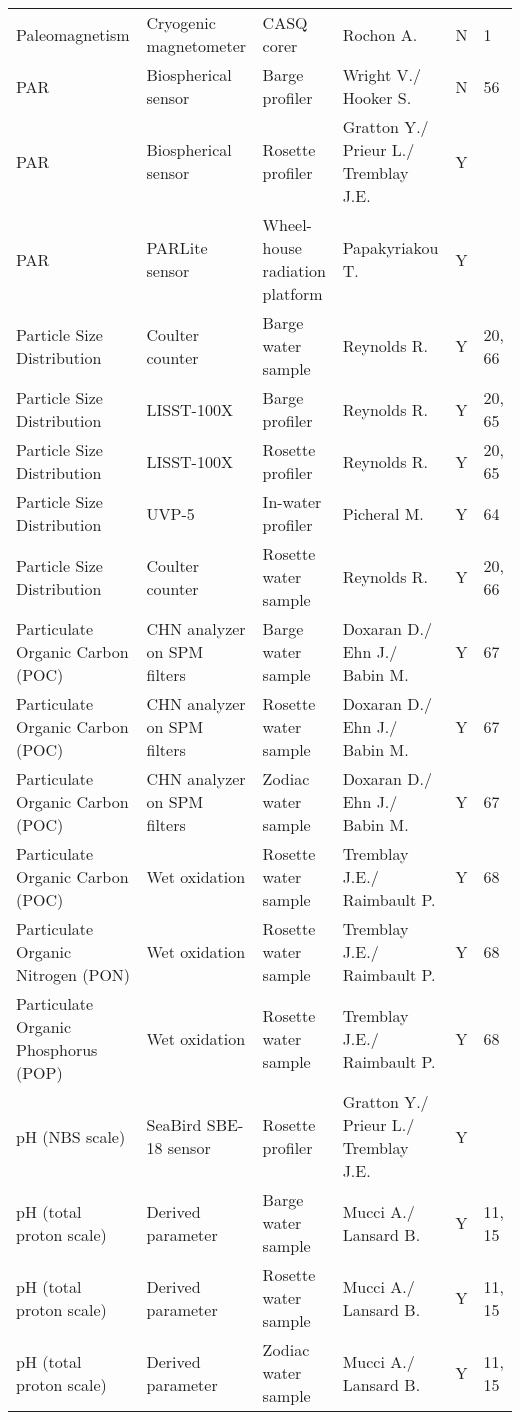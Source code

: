 \begin{ThreePartTable}
\begin{longtable}[t]{llllll}
\addlinespace
Paleomagnetism & Cryogenic magnetometer & CASQ corer & Rochon A. & N & 1\\
PAR & Biospherical sensor & Barge profiler & Wright V./ Hooker S. & N & 56\\
PAR & Biospherical sensor & Rosette profiler & Gratton Y./ Prieur L./ Tremblay J.E. & Y & \\
PAR & PARLite sensor & Wheel-house radiation platform & Papakyriakou T. & Y & \\
Particle Size Distribution & Coulter counter & Barge water sample & Reynolds R. & Y & 20, 66\\
\addlinespace
Particle Size Distribution & LISST-100X & Barge profiler & Reynolds R. & Y & 20, 65\\
Particle Size Distribution & LISST-100X & Rosette profiler & Reynolds R. & Y & 20, 65\\
Particle Size Distribution & UVP-5 & In-water profiler & Picheral M. & Y & 64\\
Particle Size Distribution & Coulter counter & Rosette water sample & Reynolds R. & Y & 20, 66\\
Particulate Organic Carbon (POC) & CHN analyzer on SPM filters & Barge water sample & Doxaran D./ Ehn J./ Babin M. & Y & 67\\
\addlinespace
Particulate Organic Carbon (POC) & CHN analyzer on SPM filters & Rosette water sample & Doxaran D./ Ehn J./ Babin M. & Y & 67\\
Particulate Organic Carbon (POC) & CHN analyzer on SPM filters & Zodiac water sample & Doxaran D./ Ehn J./ Babin M. & Y & 67\\
Particulate Organic Carbon (POC) & Wet oxidation & Rosette water sample & Tremblay J.E./ Raimbault P. & Y & 68\\
Particulate Organic Nitrogen (PON) & Wet oxidation & Rosette water sample & Tremblay J.E./ Raimbault P. & Y & 68\\
Particulate Organic Phosphorus (POP) & Wet oxidation & Rosette water sample & Tremblay J.E./ Raimbault P. & Y & 68\\
\addlinespace
pH (NBS scale) & SeaBird SBE-18 sensor & Rosette profiler & Gratton Y./ Prieur L./ Tremblay J.E. & Y & \\
pH (total proton scale) & Derived parameter & Barge water sample & Mucci A./ Lansard B. & Y & 11, 15\\
pH (total proton scale) & Derived parameter & Rosette water sample & Mucci A./ Lansard B. & Y & 11, 15\\
pH (total proton scale) & Derived parameter & Zodiac water sample & Mucci A./ Lansard B. & Y & 11, 15\\

\end{longtable}
\end{ThreePartTable}
